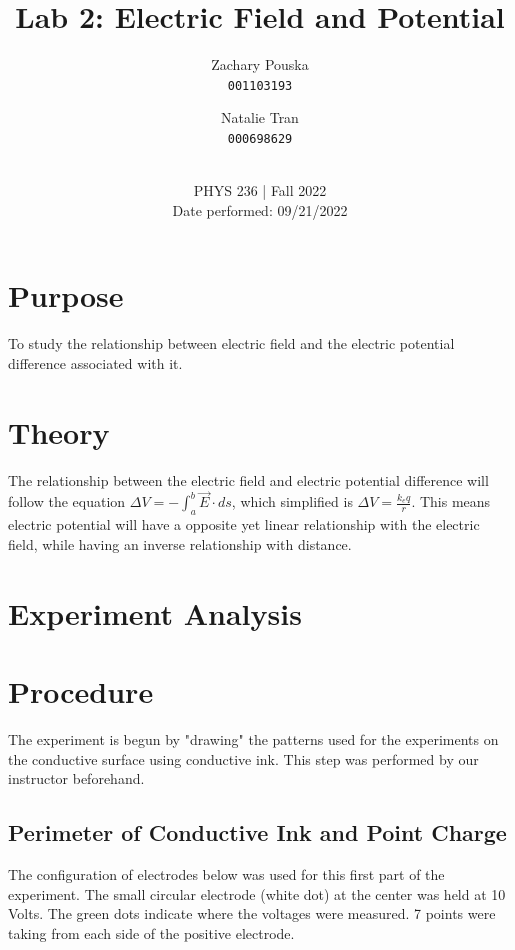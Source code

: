 \documentclass[titlepage]{article}
\begin{document}
\title{\textbf{Lab 2: Electric Field and Potential}}
\author{
    Zachary Pouska\\
    \texttt{001103193}\\
    \and
    Natalie Tran \\ 
    \texttt{000698629}\\ \\
} 

\date{PHYS 236 | Fall 2022\\
Date performed: 09/21/2022}


	\maketitle



	\section{Purpose}
	To study the relationship between electric field and the electric potential difference associated with it.
	\section{Theory}	
	The relationship between the electric field and electric potential difference will follow the equation \(\Delta V = -\int_{a}^{b} \vec{E} \cdot ds\), which simplified is \(\Delta V = \frac{k_{e}q}{r}\). This means electric potential will have a opposite yet linear relationship with the electric field, while having an inverse relationship with distance.
	\section{Experiment Analysis}
	\section{Procedure}
    The experiment is begun by "drawing" the patterns used for the experiments on the conductive surface using conductive ink. This step was performed by our instructor beforehand. 
    \subsection{Perimeter of Conductive Ink and Point Charge}
    The configuration of electrodes below was used for this first part of the experiment. The small circular electrode (white dot) at the center was held at 10 Volts. The green dots indicate where the voltages were measured. 7 points were taking from each side of the positive electrode.
\end{document}
